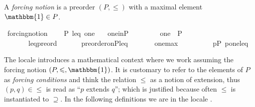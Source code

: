 \begin{definition}
  A \emph{forcing notion} is a preorder $(P,\leqslant)$ with a maximal element $\mathbbm{1} \in P$.
  \begin{isabelle}
\isamarkupfalse%
\ forcing{\isacharunderscore}notion\ {\isacharequal}\isanewline
\ \ \ P\ leq\ one\isanewline
\ \ \ one{\isacharunderscore}in{\isacharunderscore}P{\isacharcolon}\ \ \ \ \ \ \ \ \ {\isachardoublequoteopen}one\ {\isasymin}\ P{\isachardoublequoteclose}\isanewline
\ \ \ \ \ \ \ leq{\isacharunderscore}preord{\isacharcolon}\ \ \ \ \ \ \ {\isachardoublequoteopen}preorder{\isacharunderscore}on{\isacharparenleft}P{\isacharcomma}leq{\isacharparenright}{\isachardoublequoteclose}\isanewline
\ \ \ \ \ \ \ one{\isacharunderscore}max{\isacharcolon}\ \ \ \ \ \ \ \ \ \ {\isachardoublequoteopen}{\isasymforall}p{\isasymin}P{\isachardot}\ {\isasymlangle}p{\isacharcomma}one{\isasymrangle}{\isasymin}leq{\isachardoublequoteclose}
\end{isabelle}
\end{definition}
\noindent The locale   introduces a mathematical
context where we work assuming the forcing notion
$(P,\leqslant, \mathbbm{1})$. It is customary to refer to the elements
of $P$ as \emph{forcing conditions} and think the relation $\leqslant$
as a notion of extension, thus $(p,q) \in \leqslant$ is read as ``$p$
extends $q$''; which is justified because often $\leqslant$ is
instantiated to $\supseteq$. In the following definitions we are in
the locale .

